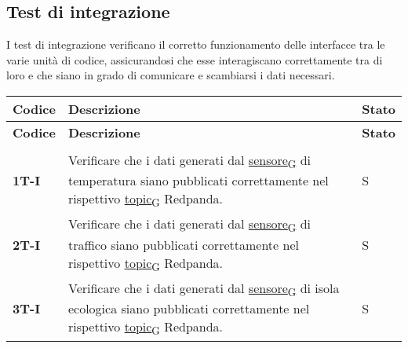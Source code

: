 \subsection{Test di integrazione}
I test di integrazione verificano il corretto funzionamento delle interfacce tra le varie unità di codice,
assicurandosi che esse interagiscano correttamente tra di loro e che siano in grado di comunicare e scambiarsi i dati necessari. \\
\begin{longtable}{|>{\raggedright\arraybackslash}m{}|>{\raggedright\arraybackslash}m{}|>{\raggedright\arraybackslash}m{}|}
	\hline
	\textbf{Codice} & \textbf{Descrizione}                                                                                                                                                                                                                                                                                                                & \textbf{Stato} \\
	\hline
	\endfirsthead
	\hline
	\textbf{Codice} & \textbf{Descrizione}                                                                                                                                                                                                                                                                                                                & \textbf{Stato} \\
	\endhead
	\multicolumn{3}{|c|}{\textbf{Python}} \\
	\hline
	\textbf{1T-I}   & Verificare che i dati generati dal \href{https://7last.github.io/docs/rtb/documentazione-interna/glossario\#sensore}{sensore\textsubscript{G}} di temperatura siano pubblicati correttamente nel rispettivo \href{https://7last.github.io/docs/rtb/documentazione-interna/glossario\#topic}{topic\textsubscript{G}} Redpanda.       & S              \\
	\hline
	\textbf{2T-I}   & Verificare che i dati generati dal \href{https://7last.github.io/docs/rtb/documentazione-interna/glossario\#sensore}{sensore\textsubscript{G}} di traffico siano pubblicati correttamente nel rispettivo \href{https://7last.github.io/docs/rtb/documentazione-interna/glossario\#topic}{topic\textsubscript{G}} Redpanda.          & S              \\
	\hline
	\textbf{3T-I}   & Verificare che i dati generati dal \href{https://7last.github.io/docs/rtb/documentazione-interna/glossario\#sensore}{sensore\textsubscript{G}} di isola ecologica siano pubblicati correttamente nel rispettivo \href{https://7last.github.io/docs/rtb/documentazione-interna/glossario\#topic}{topic\textsubscript{G}} Redpanda.   & S              \\

\end{longtable}
